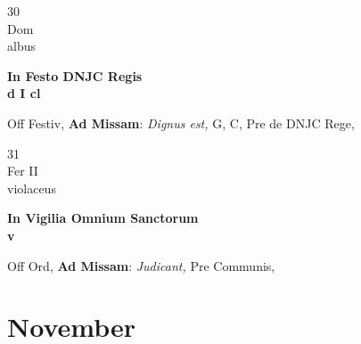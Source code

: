 \documentclass[10pt, openany]{book}
\begin{document}
        \begin{center}
            \begin{minipage}{3.5in}
                \vspace{2em}
                \begin{minipage}{0.5in}
                    {\Huge 30} \\
                    {\normalsize Dom} \\
                    {\normalsize albus}
                \end{minipage}
                \begin{minipage}{3.0in}
                    \textbf{ \large In Festo DNJC Regis \\
                    \textnormal{\normalsize d I cl}} \\ 
                \end{minipage}
                \begin{justify}Off Festiv, \textbf{Ad Missam}: \textit{Dignus est,} G, C, Pre de DNJC Rege,   
                \end{justify}
            \end{minipage}
        \end{center}
    
        \begin{center}
            \begin{minipage}{3.5in}
                \vspace{2em}
                \begin{minipage}{0.5in}
                    {\Huge 31} \\
                    {\normalsize Fer II} \\
                    {\normalsize violaceus}
                \end{minipage}
                \begin{minipage}{3.0in}
                    \textbf{ \large In Vigilia Omnium Sanctorum \\
                    \textnormal{\normalsize v}} \\ 
                \end{minipage}
                \begin{justify}Off Ord, \textbf{Ad Missam}: \textit{Judicant,} Pre Communis,   
                \end{justify}
            \end{minipage}
        \end{center}
    
        \chapter{November}
                        
\end{document}
